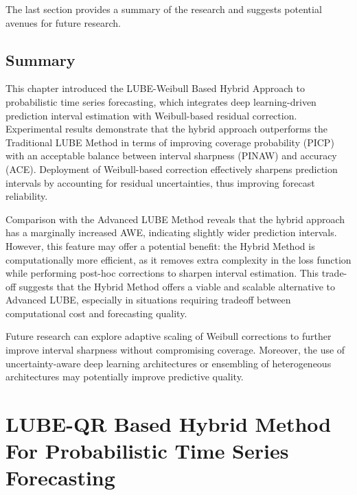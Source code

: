 The last section provides a summary of the research and suggests potential avenues for future research.

\section{Summary}
This chapter introduced the LUBE-Weibull Based Hybrid Approach to probabilistic time series forecasting, which integrates deep learning-driven prediction interval estimation with Weibull-based residual correction. Experimental results demonstrate that the hybrid approach outperforms the Traditional LUBE Method in terms of improving coverage probability (PICP) with an acceptable balance between interval sharpness (PINAW) and accuracy (ACE). Deployment of Weibull-based correction effectively sharpens prediction intervals by accounting for residual uncertainties, thus improving forecast reliability.

Comparison with the Advanced LUBE Method reveals that the hybrid approach has a marginally increased AWE, indicating slightly wider prediction intervals. However, this feature may offer a potential benefit: the Hybrid Method is computationally more efficient, as it removes extra complexity in the loss function while performing post-hoc corrections to sharpen interval estimation. This trade-off suggests that the Hybrid Method offers a viable and scalable alternative to Advanced LUBE, especially in situations requiring tradeoff between computational cost and forecasting quality.

Future research can explore adaptive scaling of Weibull corrections to further improve interval sharpness without compromising coverage. Moreover, the use of uncertainty-aware deep learning architectures or ensembling of heterogeneous architectures may potentially improve predictive quality.

\chapter{LUBE-QR Based Hybrid Method For Probabilistic Time Series Forecasting}\label{January Update}

